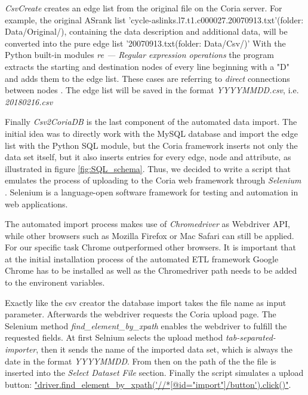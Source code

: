\documentclass[conference, 11pt]{IEEEtran}
\begin{document}


\textit{CsvCreate} creates an edge list from the original file on the Coria server.
For example, the original ASrank list 'cycle-aslinks.l7.t1.c000027.20070913.txt'(folder: Data/Original/), containing the data description and additional data, will be converted into the pure edge list '20070913.txt(folder: Data/Csv/)' With the Python built-in modules \textit{re — Regular expression operations} %
the program extracts the starting and destination nodes of every line beginning with a "D" and adds them to the edge list. These cases are referring to \textit{direct} connections between nodes \cite{IPv4Data}. The edge list will be saved in the format \textit{YYYYMMDD.csv}, i.e. \textit{20180216.csv}
\linebreak




Finally \textit{Csv2CoriaDB} is the last component of the automated data import. The initial idea was to directly work with the MySQL database and import the edge list with the Python SQL module, but the Coria framework inserts not only the data set itself, but it also inserts entries for every edge, node and attribute, as illustrated in figure \ref{fig:SQL_schema}. Thus, we decided to write a script that emulates the process of uploading to the Coria web framework through \textit{Selenium} \cite{selenium}. Selenium is a language-open software framework for testing and automation in web applications.\linebreak

The automated import process makes use of \textit{Chromedriver} as Webdriver API, while other browsers such as Mozilla Firefox or Mac Safari can still be applied. For our specific task Chrome outperformed other browsers. It is important that at the initial installation process of the automated ETL framework Google Chrome has to be installed as well as the Chromedriver path needs to be added to the environent variables.

Exactly like the csv creator the database import takes the file name as input parameter.
Afterwards the webdriver requests the Coria upload page. The Selenium method \textit{find\_element\_by\_xpath} enables the webdriver to fulfill the requested fields.
At first Selnium selects the upload method \textit{tab-separated-importer}, then it sends the name of the imported data set, which is always the date in the format \textit{YYYYMMDD}.
From then on the path of the the file is inserted into the \textit{Select Dataset File} section. 
Finally the script simulates a upload button: \url{"driver.find_element_by_xpath('//*[@id="import"]/button').click()"}. \\
\end{document}
